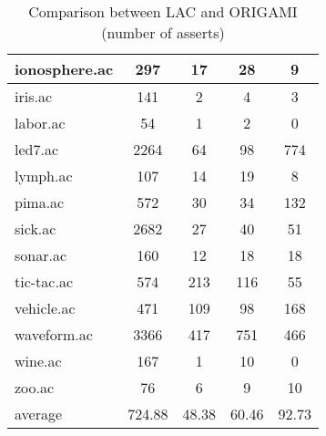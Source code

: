 \begin{table}[htbp]
\begin{tabular}{|l|c|c|c|c|}
		\hline
		ionosphere.ac   & 297           & 17                 & 28                       & 9                             \\
		\hline
		iris.ac         & 141           & 2                  & 4                        & 3                             \\
		\hline
		labor.ac        & 54            & 1                  & 2                        & 0                             \\
		\hline
		led7.ac         & 2264          & 64                 & 98                       & 774                           \\
		\hline
		lymph.ac        & 107           & 14                 & 19                       & 8                             \\
		\hline
		pima.ac         & 572           & 30                 & 34                       & 132                           \\
		\hline
		sick.ac         & 2682          & 27                 & 40                       & 51                            \\
		\hline
		sonar.ac        & 160           & 12                 & 18                       & 18                            \\
		\hline
		tic-tac.ac      & 574           & 213                & 116                      & 55                            \\
		\hline
		vehicle.ac      & 471           & 109                & 98                       & 168                           \\
		\hline
		waveform.ac     & 3366          & 417                & 751                      & 466                           \\
		\hline
		wine.ac         & 167           & 1                  & 10                       & 0                             \\
		\hline
		zoo.ac          & 76            & 6                  & 9                        & 10                            \\
		\hline
		average         & 724.88        & 48.38              & 60.46                    & 92.73                         \\
		\hline
		\end{tabular}
	\caption{Comparison between LAC and ORIGAMI (number of asserts)}
	\label{tab:comparison_lac_origami}
\end{table}